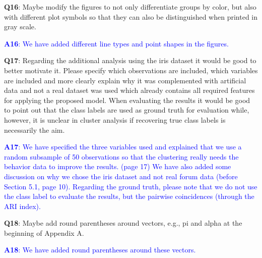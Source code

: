 \documentclass[]{article}
\begin{document}
	
	\vspace{3mm}
	\textbf{Q16}:  Maybe modify the figures to not only differentiate groups by color, but also with different plot symbols so that they can also be distinguished when printed in gray scale.

	\textcolor{blue}{  
	\textbf{A16}: We have added different line types and point shapes in the figures.
	} 

	
	\vspace{3mm}
	\textbf{Q17}: Regarding the additional analysis using the iris dataset it would be good to better motivate it. Please specify which observations are included, which variables are included and more clearly explain why it was complemented with artificial data and not a real dataset was used which already contains all required features for applying the proposed model. When evaluating the results it would be good to point out that the class labels are used as ground truth for evaluation while, however, it is unclear in cluster analysis if recovering true class labels is necessarily the aim.

	\textcolor{blue}{  
	\textbf{A17}:  We have specified the three variables used and explained that we use a random subsample of 50 observations so that the clustering really needs the behavior data to improve the results.  (page 17) We have also added some discussion on why we chose the iris dataset and not real forum data (before Section 5.1, page 10). Regarding the ground truth, please note that we do not use the class label to evaluate the results, but the pairwise coincidences (through the ARI index).
	} 
	
	\vspace{3mm}
	\textbf{Q18}: Maybe add round parentheses around vectors, e.g., pi and alpha at the beginning of Appendix A.
	
	\textcolor{blue}{  
	\textbf{A18}: We have added round parentheses around these vectors.
	} 
	
\end{document}
